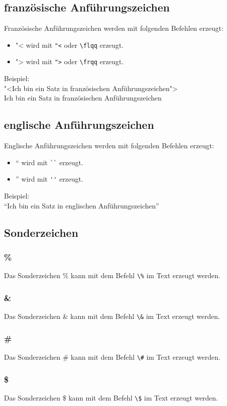 \documentclass[
12pt
]{scrreprt}
\begin{document}
\subsection{französische Anführungszeichen}
Französische Anführungszeichen werden mit folgenden Befehlen erzeugt: \\
\begin{itemize}
\item "< wird mit \verb!"<! oder \verb!\flqq! erzeugt.
\item "> wird mit \verb!">! oder \verb!\frqq! erzeugt.
\end{itemize}
Beispiel: \\
"<Ich bin ein Satz in französischen Anführungszeichen"> \\
\flqq Ich bin ein Satz in französischen Anführungszeichen\frqq
\subsection{englische Anführungszeichen}
Englische Anführungszeichen werden mit folgenden Befehlen erzeugt: \\
\begin{itemize}
\item `` wird mit \verb!``! erzeugt.
\item '' wird mit \verb!''! erzeugt.
\end{itemize}
Beispiel: \\
``Ich bin ein Satz in englischen Anführungszeichen''
\subsection{Sonderzeichen}
\subsubsection{\%}
Das Sonderzeichen \% kann mit dem Befehl \verb!\%! im Text erzeugt werden.
\subsubsection{\&}
Das Sonderzeichen \& kann mit dem Befehl \verb!\&! im Text erzeugt werden.
\subsubsection{\#}
Das Sonderzeichen \# kann mit dem Befehl \verb!\#! im Text erzeugt werden.
\subsubsection{\$}
Das Sonderzeichen \$ kann mit dem Befehl \verb!\$! im Text erzeugt werden.
\end{document}
